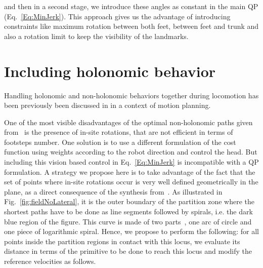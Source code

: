 \noindent and then in a second stage, we introduce these angles as constant in the main QP (Eq.~\ref{Eq:MinJerk}). This approach gives us the advantage of introducing constraints like maximum rotation between both feet, between feet and trunk and also a rotation limit to keep the visibility of the landmarks.





\section{Including holonomic behavior}
\label{sec:includingholonomic}

Handling holonomic and non-holonomic behaviors together during locomotion has been previously been discussed in \citep{MombaurHumanoids2008} in a context of motion planning.

One of the most visible disadvantages of the optimal non-holonomic paths given from~\citep{jib-IJHR2010} is the presence of in-site rotations, that are not efficient in terms of footsteps number.
One solution is to use a different formulation of the cost function using weights according to the robot direction and control the head.
But including this vision based control in Eq.~\ref{Eq:MinJerk} is incompatible with a QP formulation.
A strategy we propose here is to take advantage of the fact that the set of points where in-site rotations occur is very well defined geometrically in the plane, as a direct consequence of the synthesis from~\citep{Salaris:2010}. As illustrated in Fig.~\ref{fig:fieldNoLateral}, it is the outer boundary of the partition zone where the shortest paths have to be done as line segments followed by spirals, i.e. the dark blue region of the figure. This curve is made of two parts~\citep{Salaris:2010}, one arc of circle and one piece of logarithmic spiral. Hence, we propose to perform the following: for all points inside the partition regions in contact with this locus, we evaluate its distance in terms of the primitive to be done to reach this locus and modify the reference velocities as follows. 


